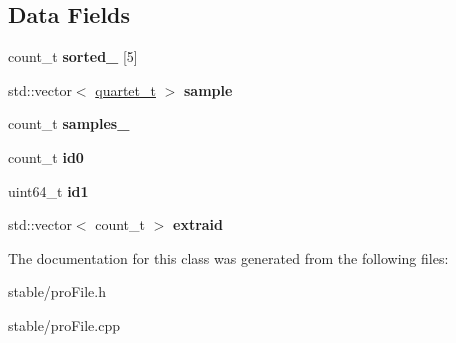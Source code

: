 \subsection*{Data Fields}
\begin{DoxyCompactItemize}
\item 
\hypertarget{classsite__t_a59002cfdf60f62314582d7040632fa70}{count\-\_\-t {\bfseries sorted\-\_\-} \mbox{[}5\mbox{]}}\label{classsite__t_a59002cfdf60f62314582d7040632fa70}

\item 
\hypertarget{classsite__t_aa4059090844c1cd1d3bd02a4f5d10a44}{std\-::vector$<$ \hyperlink{structquartet}{quartet\-\_\-t} $>$ {\bfseries sample}}\label{classsite__t_aa4059090844c1cd1d3bd02a4f5d10a44}

\item 
\hypertarget{classsite__t_aa244b253a1ba5b3a1f82fdee77e5f953}{count\-\_\-t {\bfseries samples\-\_\-}}\label{classsite__t_aa244b253a1ba5b3a1f82fdee77e5f953}

\item 
\hypertarget{classsite__t_a3ae02e722d893ed7144f3dbad4206c90}{count\-\_\-t {\bfseries id0}}\label{classsite__t_a3ae02e722d893ed7144f3dbad4206c90}

\item 
\hypertarget{classsite__t_a32449f3501d624c55573fe75e90ff5df}{uint64\-\_\-t {\bfseries id1}}\label{classsite__t_a32449f3501d624c55573fe75e90ff5df}

\item 
\hypertarget{classsite__t_ab00b021678247acbda89525c122466c7}{std\-::vector$<$ count\-\_\-t $>$ {\bfseries extraid}}\label{classsite__t_ab00b021678247acbda89525c122466c7}

\end{DoxyCompactItemize}


The documentation for this class was generated from the following files\-:\begin{DoxyCompactItemize}
\item 
stable/pro\-File.\-h\item 
stable/pro\-File.\-cpp\end{DoxyCompactItemize}
